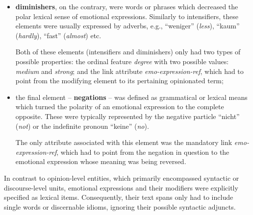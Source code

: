 \begin{itemize}
\item
  \textbf{diminishers}, on the contrary, were words or phrases which
  decreased the polar lexical sense of emotional expressions.
  Similarly to intensifiers, these elements were usually expressed by
  adverbs, e.g., ``weniger'' (\emph{less}), ``kaum'' (\emph{hardly}),
  ``fast'' (\emph{almost}) etc.

  Both of these elements (intensifiers and diminishers) only had two
  types of possible properties: the ordinal feature \emph{degree} with
  two possible values: \emph{medium} and \emph{strong}; and the link
  attribute \emph{emo-expression-ref}, which had to point from the
  modifying element to its pertaining opinionated term;

\item
  the final element -- \textbf{negations} -- was defined as
  grammatical or lexical means which turned the polarity of an
  emotional expression to the complete opposite.  These were typically
  represented by the negative particle ``nicht'' (\emph{not}) or the
  indefinite pronoun ``keine'' (\emph{no}).

  The only attribute associated with this element was the mandatory
  link \emph{emo-expression-ref}, which had to point from the negation
  in question to the emotional expression whose meaning was being
  reversed.
\end{itemize}

In contrast to opinion-level entities, which primarily encompassed
syntactic or discourse-level units, emotional expressions and their
modifiers were explicitly specified as lexical items.  Consequently,
their text spans only had to include single words or discernable
idioms, ignoring their possible syntactic adjuncts.

